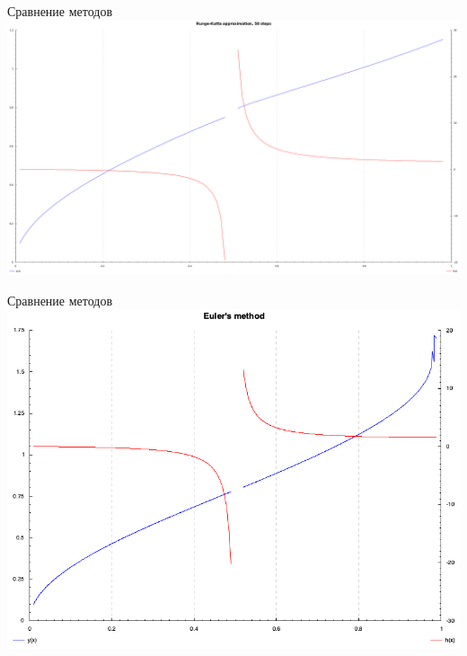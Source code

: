 \documentclass{beamer}
\begin{document}
\begin{frame}{Сравнение методов}
	\includegraphics[scale=0.17]{runge50}
\end{frame}
\begin{frame}{Сравнение методов}
    \includegraphics[scale=0.4]{euler}
\end{frame}
\end{document}
